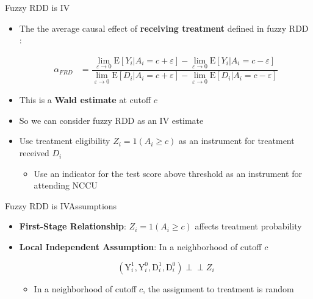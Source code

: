 \documentclass[hyperref={pdfpagelabels=false}]{beamer}
\newcommand{\indep}{\perp\!\!\!\perp}
\begin{document}
\begin{frame}{Fuzzy RDD is IV}{}
	\begin{itemize}
		
		\item The the average causal effect of \textbf{receiving treatment} defined in fuzzy RDD :
		
		\begin{equation*}
			\begin{aligned}
				\alpha_{FRD} &=\dfrac{\lim_{\varepsilon\rightarrow 0}\mathrm{E}[Y_{i}|A_{i}=c+\varepsilon]-\lim_{\varepsilon\rightarrow 0}\mathrm{E}[Y_{i}|A_{i}=c-\varepsilon]}{	\lim_{\varepsilon\rightarrow 0}\mathrm{E}[D_{i}|A_{i}=c+\varepsilon]-\lim_{\varepsilon\rightarrow 0}\mathrm{E}[D_{i}|A_{i}=c-\varepsilon]} 
			\end{aligned}
		\end{equation*} 
		
		
		\item This is a \textbf{Wald estimate} at cutoff $c$
		\vspace{0.2cm}
		\item So we can consider fuzzy RDD as an IV estimate
		\vspace{0.2cm}
		\item Use treatment eligibility $Z_{i}=1(A_i\geq c)$ as an instrument for treatment received $D_{i}$
		\vspace{0.2cm}
		\begin{itemize}
			\item Use an indicator for the test score above threshold as an instrument for attending NCCU
		\end{itemize}	
	\end{itemize}
\end{frame}





\begin{frame}{Fuzzy RDD is IV}{Assumptions}
	\begin{itemize}
		
		\item \textbf{First-Stage Relationship}: $Z_{i}=1(A_i\geq c)$ affects treatment probability
		
		\vspace{0.2cm}
		\item \textbf{Local Independent Assumption}: In a neighborhood of cutoff $c$
		
		\begin{equation*}
			(\mathrm{Y}^{1}_{i},\mathrm{Y}^{0}_{i}, \mathrm{D}^{1}_{i},\mathrm{D}^{0}_{i})\indep Z_{i}
		\end{equation*}
		\vspace{0.2cm}
		\begin{itemize}
			\item In a neighborhood of cutoff $c$, the assignment to treatment is random		
		\end{itemize}		
		
	\end{itemize}
\end{frame}
\end{document}
